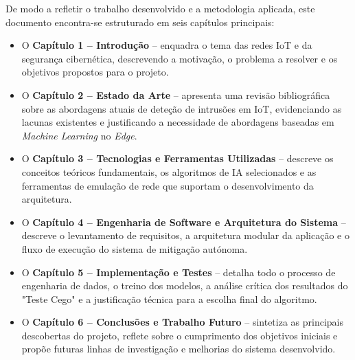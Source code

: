 De modo a refletir o trabalho desenvolvido e a metodologia aplicada, este documento encontra-se estruturado em seis capítulos principais:
\begin{itemize}
    \item O \textbf{Capítulo 1 -- Introdução} -- enquadra o tema das redes \ac{IoT} e da segurança cibernética, descrevendo a motivação, o problema a resolver e os objetivos propostos para o projeto.
    
    \item O \textbf{Capítulo 2 -- Estado da Arte} -- apresenta uma revisão bibliográfica sobre as abordagens atuais de deteção de intrusões em \ac{IoT}, evidenciando as lacunas existentes e justificando a necessidade de abordagens baseadas em \textit{Machine Learning} no \textit{Edge}.
    
    \item O \textbf{Capítulo 3 -- Tecnologias e Ferramentas Utilizadas} -- descreve os conceitos teóricos fundamentais, os algoritmos de \ac{IA} selecionados e as ferramentas de emulação de rede que suportam o desenvolvimento da arquitetura.
    
    \item O \textbf{Capítulo 4 -- Engenharia de Software e Arquitetura do Sistema} -- descreve o levantamento de requisitos, a arquitetura modular da aplicação e o fluxo de execução do sistema de mitigação autónoma.
    
    \item O \textbf{Capítulo 5 -- Implementação e Testes} -- detalha todo o processo de engenharia de dados, o treino dos modelos, a análise crítica dos resultados do "Teste Cego" e a justificação técnica para a escolha final do algoritmo.
    
    \item O \textbf{Capítulo 6 -- Conclusões e Trabalho Futuro} -- sintetiza as principais descobertas do projeto, reflete sobre o cumprimento dos objetivos iniciais e propõe futuras linhas de investigação e melhorias do sistema desenvolvido.
\end{itemize}